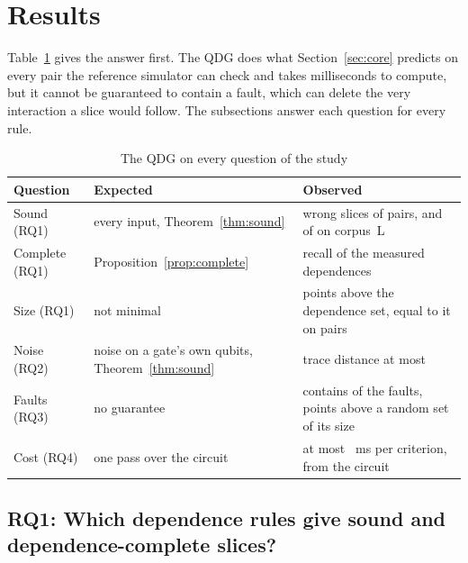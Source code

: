 \section{Results}\label{sec:results}

Table~\ref{tab:scorecard} gives the answer first. The QDG does what Section~\ref{sec:core} predicts on every pair the
reference simulator can check and takes milliseconds to compute, but it cannot be guaranteed to contain a fault, which can delete the very
interaction a slice would follow. The subsections answer each question for every rule.

\begin{table}[t]
  \centering
  \caption{The QDG on every question of the study}
  \label{tab:scorecard}
  \footnotesize\setlength{\tabcolsep}{3pt}\renewcommand{\arraystretch}{1.12}
  \newcommand{\sep}{\arrayrulecolor{black!25}\hline\arrayrulecolor{black}}
  \begin{tabular}{@{}l >{\raggedright\arraybackslash}p{2.0cm} >{\raggedright\arraybackslash}p{4.15cm}@{}}
    \toprule
    \textbf{Question} & \textbf{Expected} & \textbf{Observed} \\
    \midrule
    Sound (RQ1) & every input, Theorem~\ref{thm:sound} & \numRqOneLcUnsound{} wrong slices of \numNPairs{} pairs, and of \numCorpusLSoundPairs{} on corpus~L \\ \sep
    Complete (RQ1) & Proposition~\ref{prop:complete} & recall \numRqOneLcRecall{} of the measured dependences \\ \sep
    Size (RQ1) & not minimal & \numLcExcess{} points above the dependence set, equal to it on \numLcExact{} pairs \\ \sep
    Noise (RQ2) & noise on a gate's own qubits, Theorem~\ref{thm:sound} & trace distance at most \numNoiseLcCrossExactMax{} \\ \sep
    Faults (RQ3) & no guarantee & contains \numRqThreeContainLc{} of the faults, \numSizeCtlLcGain{} points above a random set of its size \\ \sep
    Cost (RQ4) & one pass over the circuit & at most \numOnePassMaxMs{}~ms per criterion, from the circuit \\
    \bottomrule
  \end{tabular}
\end{table}

\subsection{RQ1: Which dependence rules give sound and dependence-complete slices?}

